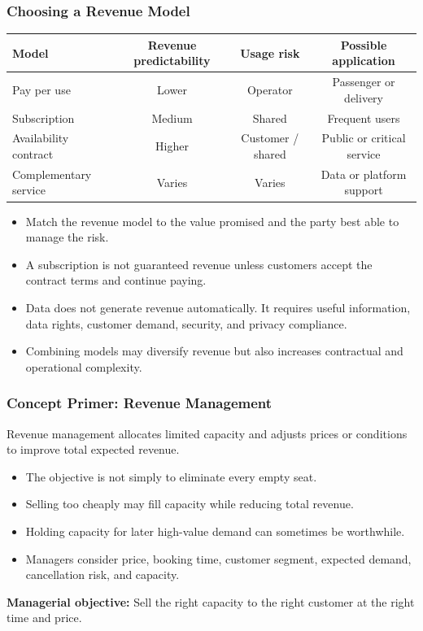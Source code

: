 \documentclass{beamer}
\begin{document}
\begin{frame}[t]
  \frametitle{Choosing a Revenue Model}
  \begin{center}
  \small
  \begin{tabular}{l|ccc}
    \textbf{Model} & Revenue predictability & Usage risk & Possible application\\
    \hline
    Pay per use & Lower & Operator & Passenger or delivery\\
    Subscription & Medium & Shared & Frequent users\\
    Availability contract & Higher & Customer / shared & Public or critical service\\
    Complementary service & Varies & Varies & Data or platform support\\
  \end{tabular}
  \end{center}
  \vspace{0.3cm}
  \begin{itemize}
    \item Match the revenue model to the value promised and the party best able to manage the risk.
    \item A subscription is not guaranteed revenue unless customers accept the contract terms and continue paying.
    \item Data does not generate revenue automatically. It requires useful information, data rights, customer demand, security, and privacy compliance.
    \item Combining models may diversify revenue but also increases contractual and operational complexity.
  \end{itemize}
\end{frame}
\begin{frame}[t]
  \frametitle{Concept Primer: Revenue Management}
  Revenue management allocates limited capacity and adjusts prices or conditions to improve total expected revenue.
  \begin{itemize}
    \item The objective is not simply to eliminate every empty seat.
    \item Selling too cheaply may fill capacity while reducing total revenue.
    \item Holding capacity for later high-value demand can sometimes be worthwhile.
    \item Managers consider price, booking time, customer segment, expected demand, cancellation risk, and capacity.
  \end{itemize}
  \textbf{Managerial objective:} Sell the right capacity to the right customer at the right time and price.
\end{frame}
\end{document}
